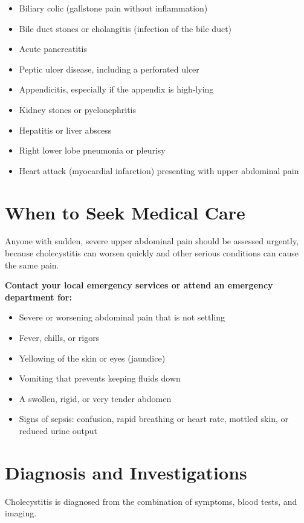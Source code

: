 \begin{itemize}
    \item Biliary colic (gallstone pain without inflammation)
    \item Bile duct stones or cholangitis (infection of the bile duct)
    \item Acute pancreatitis
    \item Peptic ulcer disease, including a perforated ulcer
    \item Appendicitis, especially if the appendix is high-lying
    \item Kidney stones or pyelonephritis
    \item Hepatitis or liver abscess
    \item Right lower lobe pneumonia or pleurisy
    \item Heart attack (myocardial infarction) presenting with upper abdominal pain
\end{itemize}

\section*{When to Seek Medical Care}
Anyone with sudden, severe upper abdominal pain should be assessed urgently, because cholecystitis can worsen quickly and other serious conditions can cause the same pain.

\textbf{Contact your local emergency services or attend an emergency department for:}
\begin{itemize}
    \item Severe or worsening abdominal pain that is not settling
    \item Fever, chills, or rigors
    \item Yellowing of the skin or eyes (jaundice)
    \item Vomiting that prevents keeping fluids down
    \item A swollen, rigid, or very tender abdomen
    \item Signs of sepsis: confusion, rapid breathing or heart rate, mottled skin, or reduced urine output
\end{itemize}

\section*{Diagnosis and Investigations}
Cholecystitis is diagnosed from the combination of symptoms, blood tests, and imaging.

